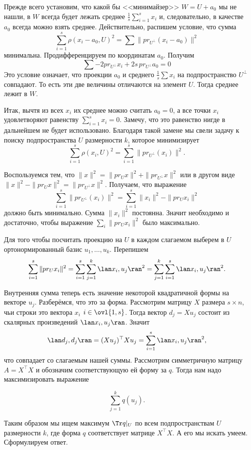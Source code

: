 Прежде всего установим, что какой бы <<минимайзер>> $W=U+a_0$ мы не нашли, в $W$ всегда будет лежать среднее $\frac{1}{s}\sum_{i=1}^s x_i$ и, следовательно, в качестве $a_0$ всегда можно взять среднее. Действительно, распишем условие, что сумма 
$$\sum_{i=1}^s \rho(x_i-a_0, U)^2=\sum \|pr_{U^{\bot}} (x_i-a_0)\|^2$$
минимальна.  Продифференцируем по координатам $a_0$. Получим $$\sum -2pr_{U^{\bot}} x_i + 2s \,pr_{U^{\bot}} a_0=0$$
 Это условие означает, что проекции $a_0$ и среднего $\frac{1}{s}\sum x_i$ на подпространство $U^{\bot}$ совпадают. То есть эти две величины отличаются на элемент $U$. Тогда среднее лежит в $W$. 

Итак, вычтя из всех $x_i$ их среднее можно считать $a_0=0$, а все точки $x_i$ удовлетворяют равенству $\sum_{i=1}^s x_i=0$. Замечу, что это равенство нигде в дальнейшем не будет использовано. Благодаря такой замене мы свели задачу к поиску подпространства $U$ размерности $k$, которое минимизирует 
$$\sum_{i=1}^s \rho(x_i, U)^2=\sum_{i=1}^s \|pr_{U^{\bot}} (x_i)\|^2.$$

Воспользуемся тем, что $\|x\|^2=\|pr_U x\|^2+\|pr_{U^{\bot}} x\|^2$ или в другом виде $\|x\|^2-\|pr_U x\|^2=\|pr_{U^{\bot}} x\|^2$. Получаем, что выражение
$$\sum_{i=1}^s \|pr_{U^{\bot}}(x_i)\|^2=\sum_{i=1}^s \|x_i\|^2-\|pr_U x_i\|^2$$
должно быть минимально. Сумма $\|x_i\|^2$ постоянна. Значит  необходимо и достаточно, чтобы выражение $\sum_i \|pr_U x_i\|^2$ было максимально.


Для того чтобы посчитать проекцию на $U$ в каждом слагаемом выберем в $U$ ортонормированный базис $u_1,\dots,u_k$. Перепишем
$$\sum_{i=1}^s \|pr_U x_i\|^2=\sum_{i=1}^s\sum_{j=1}^k \lan x_i,u_j\ran^2=\sum_{j=1}^k \sum_{i=1}^s \lan x_i,u_j\ran^2.$$

Внутренняя сумма теперь есть значение некоторой квадратичной формы на векторе $u_j$. Разберёмся, что это за форма. Рассмотрим матрицу $X$ размера $s\times n$, чьи строки это  вектора $x_i$ $i\in\ovl{1,s}$. Тогда вектор $d_j=Xu_j$ состоит из скалярных произведений  $\lan x_i, u_j\ran$. Значит 
$$\lan d_j,d_j\ran = (Xu_j)^{\top}Xu_j = \sum_{i=1}^s \lan x_i,u_j\ran^2,$$ 
что совпадает со слагаемым нашей суммы. Рассмотрим симметричную матрицу $A=X^{\top}X$ и обозначим соответствующую ей форму за $q$. Тогда нам надо максимизировать выражение

$$\sum_{j=1}^k q(u_j).$$

Таким образом мы ищем максимум $\Tr q|_{U}$ по всем подпространствам $U$ размерности $k$, где форма $q$ соответствует матрице $X^{\top} X$. А его мы искать умеем. Сформулируем  ответ. 


